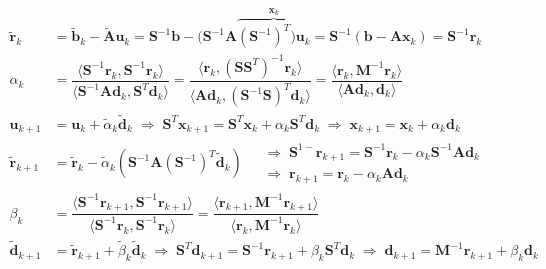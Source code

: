 \documentclass[12pt, UTF8, nofonts]{ctexart}
\begin{document}
\begin{equation}
    \label{eq:cgpredev}
    \begin{aligned}
        \tilde{\boldsymbol{r}}_k &= \tilde{\boldsymbol{b}}_k - \tilde{\boldsymbol{A}}\boldsymbol{u}_k = \boldsymbol{S}^{-1}\boldsymbol{b}-\Big(\boldsymbol{S}^{-1}\boldsymbol{A}\overbrace{(\boldsymbol{S}^{-1})^T\Big)\boldsymbol{u}_k}^{\boldsymbol{x}_k} = \boldsymbol{S}^{-1}(\boldsymbol{b}-\boldsymbol{Ax}_k) = \boldsymbol{S}^{-1}\boldsymbol{r}_k \\
        \alpha_k &= \dfrac{\Big\langle \boldsymbol{S}^{-1}\boldsymbol{r}_k, \boldsymbol{S}^{-1}\boldsymbol{r}_k \Big\rangle}{\Big\langle \boldsymbol{S}^{-1}\boldsymbol{A}\boldsymbol{d}_k, \boldsymbol{S}^T\boldsymbol{d}_k \Big\rangle} = \dfrac{\Big\langle \boldsymbol{r}_k, (\boldsymbol{SS}^{T})^{-1}\boldsymbol{r}_k \Big\rangle}{\Big\langle \boldsymbol{Ad}_k, (\boldsymbol{S}^{-1}\boldsymbol{S})^T\boldsymbol{d}_k \Big\rangle} = \dfrac{\Big\langle \boldsymbol{r}_k, \boldsymbol{M}^{-1}\boldsymbol{r}_k \Big\rangle}{\Big\langle \boldsymbol{Ad}_k, \boldsymbol{d}_k \Big\rangle} \\
        \boldsymbol{u}_{k+1} &= \boldsymbol{u}_k + \tilde{\alpha}_k\tilde{\boldsymbol{d}}_k \;\Rightarrow\;
        \boldsymbol{S}^T\boldsymbol{x}_{k+1} = \boldsymbol{S}^T\boldsymbol{x}_k + \alpha_k\boldsymbol{S}^T\boldsymbol{d}_k \;\Rightarrow\; \boldsymbol{x}_{k+1} = \boldsymbol{x}_k + \alpha_k\boldsymbol{d}_k \\
        \tilde{\boldsymbol{r}}_{k+1} &= \tilde{\boldsymbol{r}}_k-\tilde{\alpha}_k\left( \boldsymbol{S}^{-1}\boldsymbol{A}(\boldsymbol{S}^{-1})^T\tilde{\boldsymbol{d}}_k \right)
        \begin{aligned}
            & \;\Rightarrow\; \boldsymbol{S}^{1-}\boldsymbol{r}_{k+1} = \boldsymbol{S}^{-1}\boldsymbol{r}_k - \alpha_k\boldsymbol{S}^{-1}\boldsymbol{A}\boldsymbol{d}_k \\
            & \;\Rightarrow\; \boldsymbol{r}_{k+1} = \boldsymbol{r}_k - \alpha_k\boldsymbol{Ad}_k
        \end{aligned} \\
        \beta_{k} &= \dfrac{\Big\langle \boldsymbol{S}^{-1}\boldsymbol{r}_{k+1}, \boldsymbol{S}^{-1}\boldsymbol{r}_{k+1} \Big\rangle}{\Big\langle \boldsymbol{S}^{-1}\boldsymbol{r}_k, \boldsymbol{S}^{-1}\boldsymbol{r}_k \Big\rangle} = \dfrac{\Big\langle \boldsymbol{r}_{k+1}, \boldsymbol{M}^{-1}\boldsymbol{r}_{k+1} \Big\rangle}{\Big\langle \boldsymbol{r}_k,\boldsymbol{M}^{-1}\boldsymbol{r}_k \Big\rangle} \\
        \tilde{\boldsymbol{d}}_{k+1} &= \tilde{\boldsymbol{r}}_{k+1} + \tilde{\beta}_k\tilde{\boldsymbol{d}}_k \;\Rightarrow\; \boldsymbol{S}^T\boldsymbol{d}_{k+1} = \boldsymbol{S}^{-1}\boldsymbol{r}_{k+1} + \beta_{k}\boldsymbol{S}^T\boldsymbol{d}_k \;\Rightarrow\; \boldsymbol{d}_{k+1} = \boldsymbol{M}^{-1}\boldsymbol{r}_{k+1} + \beta_k\boldsymbol{d}_k
    \end{aligned}
\end{equation}
\end{document}
